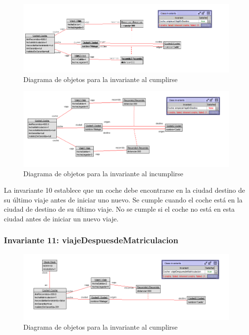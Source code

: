 \documentclass[12pt.a4paper]{article}
\begin{document}
\vspace{1.0 cm}
\begin{figure}[H]
     \includegraphics[width=1\linewidth]{Soils/10.png}
     \caption{Diagrama de objetos para la invariante al cumplirse}
     \label{Diagrama del sistema de aviacion}
\end{figure}

\begin{figure}[H]
     \includegraphics[width=1\linewidth]{Soils/10_v2.png}
     \caption{Diagrama de objetos para la invariante al incumplirse}
     \label{Diagrama del sistema de aviacion}
\end{figure}

La invariante 10 establece que un coche debe encontrarse en la ciudad destino de su último viaje antes de iniciar uno nuevo. Se cumple cuando el coche está en la ciudad de destino de su último viaje. No se cumple si el coche no está en esta ciudad antes de iniciar un nuevo viaje.

\subsubsection{Invariante 11: viajeDespuesdeMatriculacion}
    \begin{figure}[H]
         \centering
         \includegraphics[width=1\linewidth]{Soils/11.png}
         \caption{Diagrama de objetos para la invariante al cumplirse}
         \label{Diagrama_cumplimiento}
    \end{figure}
\end{document}
